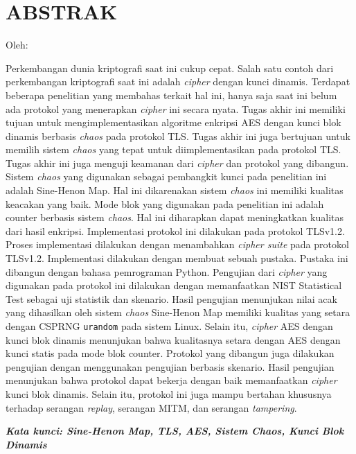 \clearpage
\chapter*{ABSTRAK}

\begin{center}
  \center
  \begin{singlespace}
    \bfseries \MakeUppercase{\thetitle}

    \normalfont\normalsize
    Oleh:
    \bfseries \theauthor
  \end{singlespace}
\end{center}


\begin{singlespace}
  Perkembangan dunia kriptografi saat ini cukup cepat. Salah satu contoh dari perkembangan kriptografi saat ini adalah \emph{cipher} dengan kunci dinamis. Terdapat beberapa penelitian yang membahas terkait hal ini, hanya saja saat ini belum ada protokol yang menerapkan \emph{cipher} ini secara nyata. Tugas akhir ini memiliki tujuan untuk mengimplementasikan algoritme enkripsi AES dengan kunci blok dinamis berbasis \emph{chaos} pada protokol TLS. Tugas akhir ini juga bertujuan untuk memilih sistem \emph{chaos} yang tepat untuk diimplementasikan pada protokol TLS. Tugas akhir ini juga menguji keamanan dari \emph{cipher} dan protokol yang dibangun. Sistem \emph{chaos} yang digunakan sebagai pembangkit kunci pada penelitian ini adalah Sine-Henon Map. Hal ini dikarenakan sistem \emph{chaos} ini memiliki kualitas keacakan yang baik. Mode blok yang digunakan pada penelitian ini adalah counter berbasis sistem \emph{chaos}. Hal ini diharapkan dapat meningkatkan kualitas dari hasil enkripsi. Implementasi protokol ini dilakukan pada protokol TLSv1.2. Proses implementasi dilakukan dengan menambahkan \emph{cipher suite} pada protokol TLSv1.2. Implementasi dilakukan dengan membuat sebuah pustaka. Pustaka ini dibangun dengan bahasa pemrograman Python. Pengujian dari \emph{cipher} yang digunakan pada protokol ini dilakukan dengan memanfaatkan NIST Statistical Test sebagai uji statistik dan skenario. Hasil pengujian menunjukan nilai acak yang dihasilkan oleh sistem \emph{chaos} Sine-Henon Map memiliki kualitas yang setara dengan CSPRNG \texttt{urandom} pada sistem Linux. Selain itu, \emph{cipher} AES dengan kunci blok dinamis menunjukan bahwa kualitasnya setara dengan AES dengan kunci statis pada mode blok counter. Protokol yang dibangun juga dilakukan pengujian dengan menggunakan pengujian berbasis skenario. Hasil pengujian menunjukan bahwa protokol dapat bekerja dengan baik memanfaatkan \emph{cipher} kunci blok dinamis. Selain itu, protokol ini juga mampu bertahan khususnya terhadap serangan \emph{replay}, serangan MITM, dan serangan \emph{tampering}.
  
  \textbf{\textit{Kata kunci: Sine-Henon Map, TLS, AES, Sistem Chaos, Kunci Blok Dinamis }}
\end{singlespace}
\clearpage
